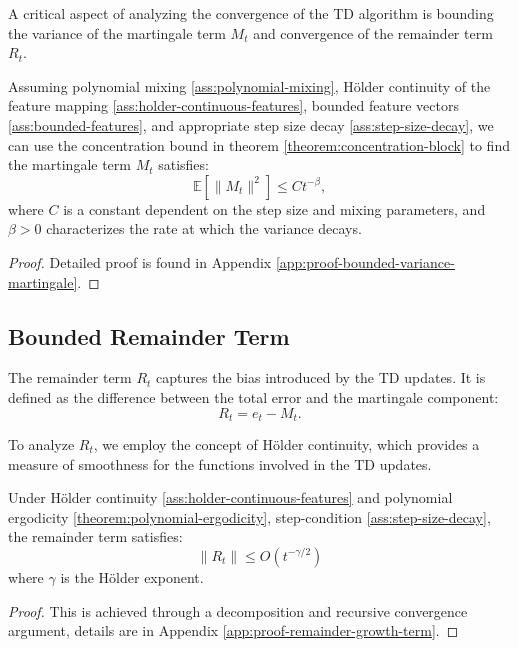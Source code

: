 A critical aspect of analyzing the convergence of the TD algorithm is bounding the variance of the martingale term \( M_t \) and convergence of the remainder term \( R_t \).

\begin{lemma}
\label{lemma:bounded-variance-martingale}
Assuming polynomial mixing \ref{ass:polynomial-mixing}, Hölder continuity of the feature mapping \ref{ass:holder-continuous-features}, bounded feature vectors \ref{ass:bounded-features}, and appropriate step size decay \ref{ass:step-size-decay}, we can use the concentration bound in theorem \ref{theorem:concentration-block} to find the martingale term \( M_t \) satisfies:
\[
\mathbb{E}[\|M_t\|^2] \leq C t^{-\beta},
\]
where \( C \) is a constant dependent on the step size and mixing parameters, and \( \beta > 0 \) characterizes the rate at which the variance decays.
\end{lemma}

\begin{proof}
Detailed proof is found in Appendix \ref{app:proof-bounded-variance-martingale}.
\end{proof}
\subsection{Bounded Remainder Term}

The remainder term $R_t$ captures the bias introduced by the TD updates. 
It is defined as the difference between the total error and the martingale component:
\[
  R_t = e_t - M_t.
\]

To analyze $R_t$, we employ the concept of H\"older continuity, which provides 
a measure of smoothness for the functions involved in the TD updates.

\begin{lemma}
\label{lemma:remainder-growth-term}
Under Hölder continuity \ref{ass:holder-continuous-features} and polynomial ergodicity \ref{theorem:polynomial-ergodicity}, step-condition \ref{ass:step-size-decay}, the remainder term satisfies:
\[
\|R_t\| \leq O(t^{-\gamma/2})
\]
where \( \gamma \) is the H\"older exponent.
\end{lemma}
\begin{proof}
This is achieved through a decomposition and recursive convergence argument, details are in Appendix \ref{app:proof-remainder-growth-term}.
\end{proof}